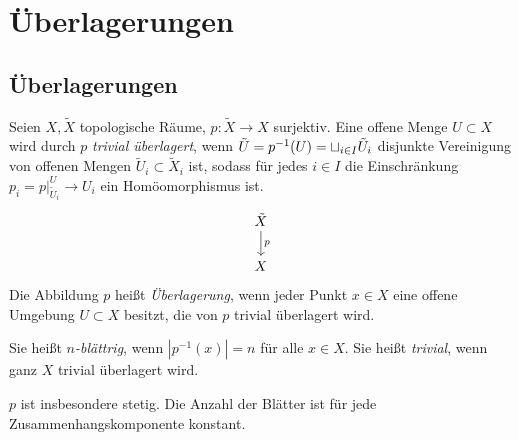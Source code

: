 \chapter{Überlagerungen}





\section{Überlagerungen}


\begin{df}
	Seien $X, \tilde X$ topologische Räume, $p: \tilde X \to X$ surjektiv.
	Eine offene Menge $U \subset X$ wird durch $p$ \emph{trivial überlagert}, wenn $\tilde U = p^{-1} (U) = \sqcup_{i\in I} \tilde U_i$ disjunkte Vereinigung von offenen Mengen $\tilde U_i \subset \tilde X_i$ ist, sodass für jedes $i \in I$ die Einschränkung $p_i = p|_{\tilde U_i}^U \to U_i$ ein Homöomorphismus ist.
	\[
		\begin{tikzcd}
			\tilde X \arrow{d}{p} \\
			X
		\end{tikzcd}
	\]
	Die Abbildung $p$ heißt \emph{Überlagerung}, wenn jeder Punkt $x \in X$ eine offene Umgebung $U \subset X$ besitzt, die von $p$ trivial überlagert wird.

	Sie heißt \emph{$n$-blättrig}, wenn $|p^{-1}(x)| = n$ für alle $x \in X$.
	Sie heißt \emph{trivial}, wenn ganz $X$ trivial überlagert wird.
	\begin{note}
		$p$ ist insbesondere stetig.
		Die Anzahl der Blätter ist für jede Zusammenhangskomponente konstant.
	\end{note}
\end{df}

